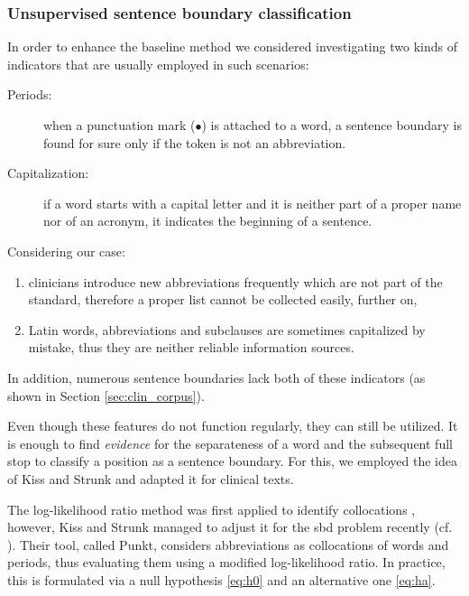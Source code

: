 \subsubsection{Unsupervised sentence boundary classification}

In order to enhance the baseline method we considered investigating two kinds of indicators that are usually employed in such scenarios:
\begin{description}
 \item[Periods:] when a punctuation mark ($\bullet$) is attached to a word, a sentence boundary is found for sure only if the token is not an abbreviation.
 \item[Capitalization:] if a word starts with a capital letter and it is neither part of a proper name nor of an acronym, it indicates the beginning of a sentence.
\end{description}
Considering our case:
\begin{enumerate}
\item clinicians introduce new abbreviations frequently which are not part of the standard, therefore a proper list cannot be collected easily, further on, 
\item Latin words, abbreviations and subclauses are sometimes capitalized by mistake, thus they are neither reliable information sources.
\end{enumerate}
In addition, numerous sentence boundaries lack both of these indicators (as shown in Section \ref{sec:clin_corpus}). %

Even though these features do not function regularly, they can still be utilized.  %
It is enough to find \emph{evidence} for the separateness of a word and the subsequent full stop to classify a position as a sentence boundary. 
For this, we employed the idea of Kiss and Strunk \cite{kiss2006unsupervised} and adapted it for clinical texts.

The log-likelihood ratio method was first applied to identify collocations \cite{dunning1993accurate}, however, Kiss and Strunk managed to adjust it for the \acrshort{sbd} problem recently (cf. \cite{kiss2006unsupervised}). 
Their tool, called Punkt, considers abbreviations as collocations of words and periods, thus evaluating them using a modified log-likelihood ratio.
In practice, this is formulated via a null hypothesis \eqref{eq:h0} and an alternative one \eqref{eq:ha}. 

